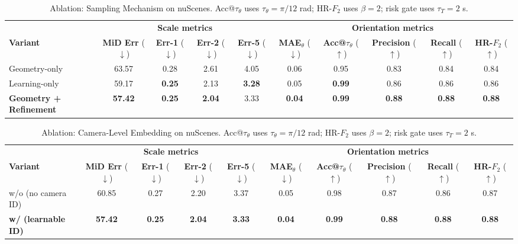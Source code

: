 \documentclass[journal]{IEEEtran}
\begin{document}
\begin{table}[t]
\centering
\caption{Ablation: Sampling Mechanism on nuScenes. Acc@\(\tau_\theta\) uses \(\tau_\theta=\pi/12\) rad; HR-\(F_2\) uses \(\beta=2\); risk gate uses \(\tau_T=2\) s.}
\label{tab:ablation_mechanism}
\setlength{\tabcolsep}{4pt}
\footnotesize
\begin{adjustbox}{width=\textwidth,center}
\begin{tabular}{@{}l cccc ccccc@{}}
\toprule
& \multicolumn{4}{c}{\textbf{Scale metrics}} & \multicolumn{5}{c}{\textbf{Orientation metrics}} \\
\cmidrule(lr){2-5} \cmidrule(lr){6-10}
\textbf{Variant}
& \textbf{MiD Err} (\(\downarrow\))
& \textbf{Err-1} (\(\downarrow\))
& \textbf{Err-2} (\(\downarrow\))
& \textbf{Err-5} (\(\downarrow\))
& \textbf{MAE\(_\theta\)} (\(\downarrow\))
& \textbf{Acc@\(\tau_\theta\)} (\(\uparrow\))
& \textbf{Precision} (\(\uparrow\))
& \textbf{Recall} (\(\uparrow\))
& \textbf{HR-\(F_2\)} (\(\uparrow\)) \\
\midrule
Geometry-only
& 63.57 & 0.28 & 2.61 & 4.05 & 0.06 & 0.95 & 0.83 & 0.84 & 0.84 \\
Learning-only
& 59.17 & \textbf{0.25} & 2.13 & \textbf{3.28} & 0.05 & \textbf{0.99} & 0.86 & 0.86 & 0.86 \\
\textbf{Geometry + Refinement}
& \textbf{57.42} & \textbf{0.25} & \textbf{2.04} & 3.33 & \textbf{0.04} & \textbf{0.99} & \textbf{0.88} & \textbf{0.88} & \textbf{0.88} \\
\bottomrule
\end{tabular}
\end{adjustbox}
\end{table}

\begin{table}[t]
\centering
\caption{Ablation: Camera-Level Embedding on nuScenes. Acc@\(\tau_\theta\) uses \(\tau_\theta=\pi/12\) rad; HR-\(F_2\) uses \(\beta=2\); risk gate uses \(\tau_T=2\) s.}
\label{tab:ablation_camembed}
\setlength{\tabcolsep}{4pt}
\footnotesize
\begin{adjustbox}{width=\textwidth,center}
\begin{tabular}{@{}l cccc ccccc@{}}
\toprule
& \multicolumn{4}{c}{\textbf{Scale metrics}} & \multicolumn{5}{c}{\textbf{Orientation metrics}} \\
\cmidrule(lr){2-5} \cmidrule(lr){6-10}
\textbf{Variant}
& \textbf{MiD Err} (\(\downarrow\))
& \textbf{Err-1} (\(\downarrow\))
& \textbf{Err-2} (\(\downarrow\))
& \textbf{Err-5} (\(\downarrow\))
& \textbf{MAE\(_\theta\)} (\(\downarrow\))
& \textbf{Acc@\(\tau_\theta\)} (\(\uparrow\))
& \textbf{Precision} (\(\uparrow\))
& \textbf{Recall} (\(\uparrow\))
& \textbf{HR-\(F_2\)} (\(\uparrow\)) \\
\midrule
w/o (no camera ID)
& 60.85 & 0.27 & 2.20 & 3.37 & 0.05 & 0.98 & 0.87 & 0.86 & 0.87 \\
\textbf{w/ (learnable ID)}
& \textbf{57.42} & \textbf{0.25} & \textbf{2.04} & \textbf{3.33} & \textbf{0.04} & \textbf{0.99} & \textbf{0.88} & \textbf{0.88} & \textbf{0.88} \\
\bottomrule
\end{tabular}
\end{adjustbox}
\end{table}
\end{document}

